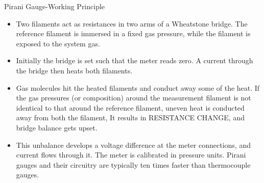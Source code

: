 \documentclass[11pt]{beamer}
\begin{document}
\begin{frame}{Pirani Gauge-Working Principle}

\begin{itemize}
\item Two filaments act as resistances in two arms of a Wheatstone bridge. The reference filament is immersed in a fixed gas pressure, while the filament is exposed to the system gas. 
\item Initially the bridge is set  such that the meter reads zero.  A current through the bridge then heats  both filaments.
\item Gas molecules hit the heated filaments and conduct away some of the heat. If the gas pressures (or composition) around the measurement filament is not identical to that around the reference filament, uneven heat is conducted away from both the filament, It results in RESISTANCE CHANGE, and bridge balance gets  upset.
\item This unbalance develops a voltage difference at the meter connections, and current flows  through  it. The meter is calibrated in pressure units. Pirani gauges and their circuitry are typically ten times faster than thermocouple gauges.
\end{itemize}



\end{frame}
\end{document}
